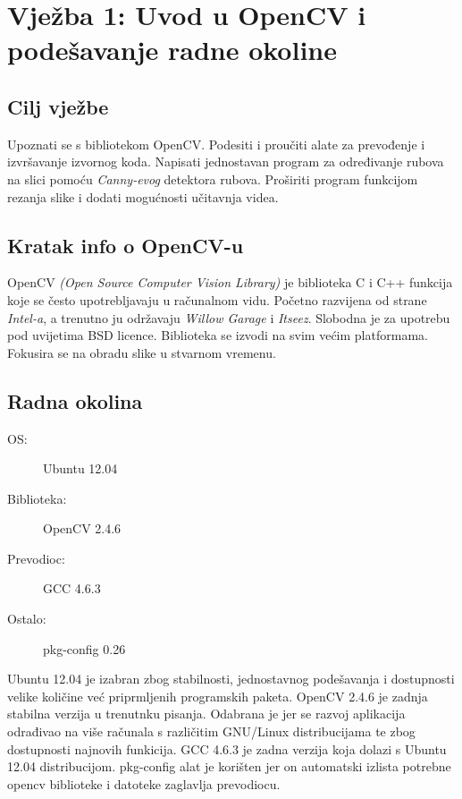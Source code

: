 \setcounter{figure}{0}
\section{Vježba 1: Uvod u OpenCV i podešavanje radne okoline}

\subsection{Cilj vježbe}
Upoznati se s bibliotekom OpenCV. Podesiti i proučiti alate 
za prevođenje i izvršavanje izvornog koda. Napisati jednostavan 
program za određivanje rubova na slici pomoću \emph{Canny-evog}
detektora rubova. Proširiti program funkcijom rezanja slike
i dodati mogućnosti učitavnja videa.\\

\subsection{Kratak info o OpenCV-u}

OpenCV \emph{(Open Source Computer Vision Library)}
je biblioteka C i C++ funkcija koje se često upotrebljavaju u računalnom vidu. 
Početno razvijena od strane \emph{Intel-a}, a trenutno ju 
održavaju \emph{Willow Garage} i \emph{Itseez}.
Slobodna je za upotrebu pod uvijetima BSD licence. Biblioteka se izvodi na svim većim 
platformama. Fokusira se na obradu slike u stvarnom vremenu.

\subsection{Radna okolina}

\begin{description}
  \item[OS:] Ubuntu 12.04
  \item[Biblioteka:] OpenCV 2.4.6
  \item[Prevodioc:] GCC 4.6.3 
  \item[Ostalo:] pkg-config 0.26
\end{description}

Ubuntu 12.04 je izabran zbog stabilnosti, jednostavnog podešavanja i 
dostupnosti velike količine već priprmljenih programskih paketa.
OpenCV 2.4.6 je zadnja stabilna verzija u trenutnku pisanja. Odabrana
je jer se razvoj aplikacija odrađivao na više računala s različitim 
GNU/Linux distribucijama te zbog dostupnosti najnovih funkicija.
GCC 4.6.3 je zadna verzija koja dolazi s Ubuntu 12.04 distribucijom.
pkg-config alat je korišten jer on automatski izlista potrebne
opencv biblioteke i datoteke zaglavlja prevodiocu. 
\\

